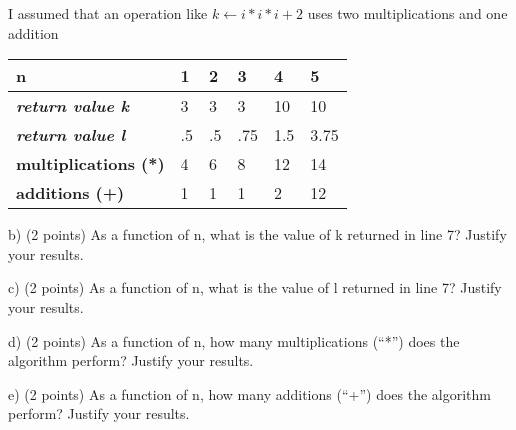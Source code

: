 \documentclass[12pt]{article}
\newenvironment{question}[2][Question]{\begin{trivlist}
		\item[\hskip \labelsep {\bfseries #1}\hskip \labelsep {\bfseries #2.}]}{\end{trivlist}}
\begin{document}
	\begin{question}{2a} 		
		I assumed that an operation like $k \leftarrow i*i*i+2$ uses two multiplications and one addition	
		
		\begin{tabular}{|l|l|l|l|l|l|}
			\hline
			\textbf{n}                       & \textbf{1} & \textbf{2} & \textbf{3} & \textbf{4} & \textbf{5} \\ \hline
			\textit{\textbf{return value k}} & 3          & 3          & 3          & 10         & 10         \\ \hline
			\textit{\textbf{return value l}} & .5         & .5         & .75        & 1.5        & 3.75       \\ \hline
			\textbf{multiplications (*)}     & 4          & 6          & 8          & 12         & 14         \\ \hline
			\textbf{additions (+)}           & 1          & 1          & 1          & 2          & 12         \\ \hline
		\end{tabular}
		
	\end{question}

	\begin{question}{2b}	
		b) (2 points) As a function of n, what is the value of k returned in line 7? Justify your results.
	\end{question}

	\begin{question}{2c}	
		c) (2 points) As a function of n, what is the value of l returned in line 7? Justify your results.
		\end{question}

\begin{question}{2d}	
		d) (2 points) As a function of n, how many multiplications (“*”) does the algorithm perform? Justify your results.
			\end{question}
	
\begin{question}{2e}	
		e) (2 points) As a function of n, how many additions (“+”) does the algorithm perform? Justify your results.
			\end{question}
	
\end{document}
